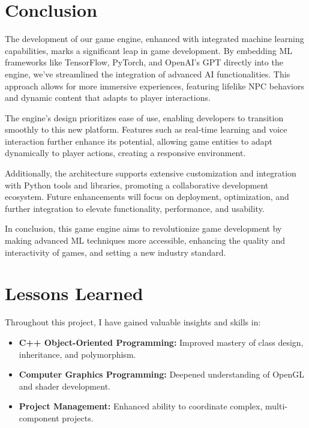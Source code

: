 





\section*{Conclusion}

The development of our game engine, enhanced with integrated machine learning capabilities, marks a significant leap in game development. By embedding ML frameworks like TensorFlow, PyTorch, and OpenAI's GPT directly into the engine, we've streamlined the integration of advanced AI functionalities. This approach allows for more immersive experiences, featuring lifelike NPC behaviors and dynamic content that adapts to player interactions.

The engine's design prioritizes ease of use, enabling developers to transition smoothly to this new platform. Features such as real-time learning and voice interaction further enhance its potential, allowing game entities to adapt dynamically to player actions, creating a responsive environment.

Additionally, the architecture supports extensive customization and integration with Python tools and libraries, promoting a collaborative development ecosystem. Future enhancements will focus on deployment, optimization, and further integration to elevate functionality, performance, and usability.

In conclusion, this game engine aims to revolutionize game development by making advanced ML techniques more accessible, enhancing the quality and interactivity of games, and setting a new industry standard.

\section*{Lessons Learned}

Throughout this project, I have gained valuable insights and skills in:

\begin{itemize}
    \item \textbf{C++ Object-Oriented Programming:} Improved mastery of class design, inheritance, and polymorphism.
    \item \textbf{Computer Graphics Programming:} Deepened understanding of OpenGL and shader development.
    \item \textbf{Project Management:} Enhanced ability to coordinate complex, multi-component projects.
\end{itemize}

